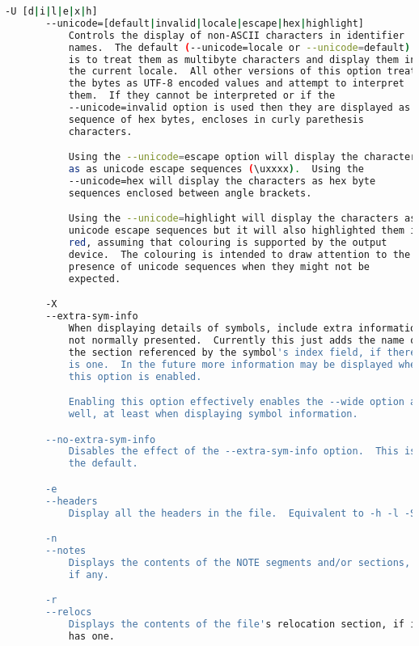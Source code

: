 {{\begin{lstlisting}[language=bash]
       -U [d|i|l|e|x|h]
       --unicode=[default|invalid|locale|escape|hex|highlight]
           Controls the display of non-ASCII characters in identifier
           names.  The default (--unicode=locale or --unicode=default)
           is to treat them as multibyte characters and display them in
           the current locale.  All other versions of this option treat
           the bytes as UTF-8 encoded values and attempt to interpret
           them.  If they cannot be interpreted or if the
           --unicode=invalid option is used then they are displayed as a
           sequence of hex bytes, encloses in curly parethesis
           characters.

           Using the --unicode=escape option will display the characters
           as as unicode escape sequences (\uxxxx).  Using the
           --unicode=hex will display the characters as hex byte
           sequences enclosed between angle brackets.

           Using the --unicode=highlight will display the characters as
           unicode escape sequences but it will also highlighted them in
           red, assuming that colouring is supported by the output
           device.  The colouring is intended to draw attention to the
           presence of unicode sequences when they might not be
           expected.

       -X
       --extra-sym-info
           When displaying details of symbols, include extra information
           not normally presented.  Currently this just adds the name of
           the section referenced by the symbol's index field, if there
           is one.  In the future more information may be displayed when
           this option is enabled.

           Enabling this option effectively enables the --wide option as
           well, at least when displaying symbol information.

       --no-extra-sym-info
           Disables the effect of the --extra-sym-info option.  This is
           the default.

       -e
       --headers
           Display all the headers in the file.  Equivalent to -h -l -S.

       -n
       --notes
           Displays the contents of the NOTE segments and/or sections,
           if any.

       -r
       --relocs
           Displays the contents of the file's relocation section, if it
           has one.


\end{lstlisting}}}
